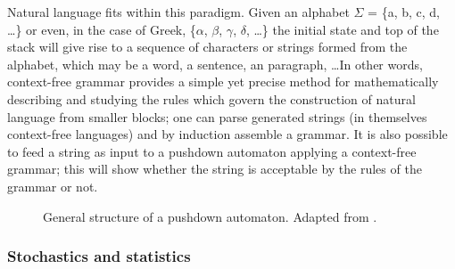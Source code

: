 Natural language fits within this paradigm. Given an alphabet $\Sigma$ = \{a,
b, c, d, \ldots\} or even, in the case of Greek, \{$\alpha$, $\beta$, $\gamma$,
$\delta$, \ldots\} the initial state and top of the stack will give rise to a
sequence of characters or strings formed from the alphabet, which may be a
word, a sentence, an paragraph, \ldots In other words, context-free grammar
provides a simple yet precise method for mathematically describing and studying
the rules which govern the construction of natural language from smaller
blocks; one can parse generated strings (in themselves context-free languages)
and by induction assemble a grammar. It is also possible to feed a string as
input to a pushdown automaton applying a context-free grammar; this will show
whether the string is acceptable by the rules of the grammar or not.

\begin{figure}
  \begin{center}
\end{center}
\caption{General structure of a pushdown automaton. Adapted from \citet[220]{hopcroft2001}.} \label{fig:pushdownautomaton}
\end{figure}

\subsubsection{Stochastics and statistics} %
\label{ssub:stochastics}

